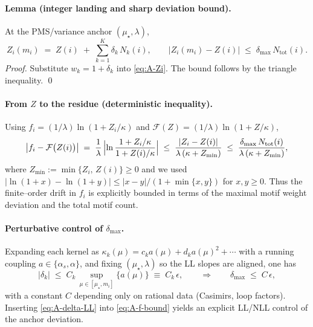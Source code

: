 \documentclass[epjc3]{svjour3}
\begin{document}
\paragraph{Lemma (integer landing and sharp deviation bound).}
At the PMS/variance anchor $(\mu_\star,\lambda)$,
\begin{equation}
  Z_i(m_i)\;=\;Z(i)\;+\;\sum_{k=1}^K \delta_k\,N_k(i),
  \qquad
  \bigl|Z_i(m_i)-Z(i)\bigr|\;\le\;\delta_{\max}\,N_{\mathrm{tot}}(i).
  \label{eq:A-int-landing}
\end{equation}
\emph{Proof.} Substitute $w_k=1+\delta_k$ into \eqref{eq:A-Zi}. The bound follows by the triangle inequality. \qed

\paragraph{From $Z$ to the residue (deterministic inequality).}
Using $f_i=(1/\lambda)\ln(1+Z_i/\kappa)$ and $\mathcal F(Z)=(1/\lambda)\ln(1+Z/\kappa)$,
\begin{equation}
  \bigl|f_i-\mathcal F\bigl(Z(i)\bigr)\bigr|
  \;=\;\frac{1}{\lambda}\,\Bigl|\ln\frac{1+Z_i/\kappa}{1+Z(i)/\kappa}\Bigr|
  \;\le\;\frac{|Z_i-Z(i)|}{\lambda\,(\kappa+Z_{\min})}
  \;\le\;\frac{\delta_{\max}\,N_{\mathrm{tot}}(i)}{\lambda\,(\kappa+Z_{\min})},
  \label{eq:A-f-bound}
\end{equation}
where $Z_{\min}:=\min\{Z_i,\,Z(i)\}\ge 0$ and we used $|\ln(1+x)-\ln(1+y)|\le |x-y|/(1+\min\{x,y\})$ for $x,y\ge 0$.
Thus the finite--order drift in $f_i$ is explicitly bounded in terms of the maximal motif weight deviation and the total motif count.

\paragraph{Perturbative control of $\delta_{\max}$.}
Expanding each kernel as $\kappa_k(\mu)=c_k a(\mu)+d_k a(\mu)^2+\cdots$ with a running coupling $a\in\{\alpha_s,\alpha\}$, and fixing $(\mu_\star,\lambda)$ so the LL slopes are aligned, one has
\begin{equation}
  |\delta_k|\;\le\;C_k\,\sup_{\mu\in[\mu_\star,m_i]}\!\bigl\{a(\mu)\bigr\}\;\equiv\;C_k\,\epsilon,
  \qquad\Rightarrow\qquad
  \delta_{\max}\;\le\;C\,\epsilon,
  \label{eq:A-delta-LL}
\end{equation}
with a constant $C$ depending only on rational data (Casimirs, loop factors). Inserting \eqref{eq:A-delta-LL} into \eqref{eq:A-f-bound} yields an explicit LL/NLL control of the anchor deviation.
\end{document}
